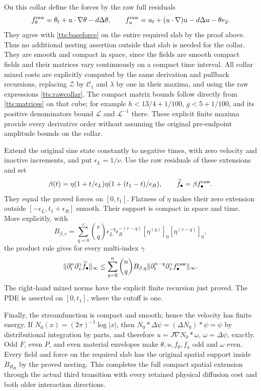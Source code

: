 On this collar define the forces by the raw full residuals
\begin{equation}\label{tts:rawcollar}
 f_\theta^{\rm raw}=\theta_t+u\cdot\nabla\theta-d\Delta\theta,
 \qquad
 f_u^{\rm raw}=u_t+(u\cdot\nabla)u-d\Delta u-\theta e_2.
\end{equation}
They agree with \eqref{tts:baseforce} on the entire required
slab by the proof above. Thus no additional nesting assertion
outside that slab is needed for the collar. They are smooth and
compact in space, since the fields are smooth compact fields and
their matrices vary continuously on a compact time interval.
All collar mixed costs are explicitly computed by the same
derivation and pullback recursions, replacing $\mathcal Z$ by
$\mathcal C_1$ and $\lambda$ by one in their maxima, and using
the raw expressions \eqref{tts:rawcollar}. The compact matrix
bounds follow directly from \eqref{tts:matrices} on that cube;
for example $h<13/4+1/100$, $g<5+1/100$, and its positive
denominators bound $\mathcal L$ and $\mathcal L^{-1}$ there.
These explicit finite maxima provide every derivative order without
assuming the original pre-endpoint amplitude bounds on the collar.

Extend the original sine state constantly to negative times, with
zero velocity and inactive increments, and put $\epsilon_L=1/\nu$.
Use the raw residuals of these extensions and set
\begin{equation}\label{tts:timecutoff}
 \beta(t)=\eta(1+t/\epsilon_L)
                   \eta(1+(t_1-t)/\epsilon_R),\qquad
 \widetilde f_\bullet=\beta f_\bullet^{\rm raw}.
\end{equation}
They equal the proved forces on $[0,t_1]$. Flatness of $\eta$
makes their zero extension outside
$[-\epsilon_L,t_1+\epsilon_R]$ smooth. Their support is compact
in space and time. More explicitly, with
\[
 B_{\beta,r}=\sum_{q=0}^r\binom rq
 \epsilon_L^{-q}\epsilon_R^{-(r-q)}
              [\eta^{(q)}]_0[\eta^{(r-q)}]_0,
\]
the product rule gives for every multi-index $\gamma$
\begin{equation}\label{tts:cutoffcost}
 \|\partial_t^n\partial_x^\gamma\widetilde f_\bullet\|_\infty
 \leq\sum_{q=0}^n\binom nq B_{\beta,q}
       \|\partial_t^{n-q}\partial_x^\gamma
                              f_\bullet^{\rm raw}\|_\infty.
\end{equation}
The right-hand mixed norms have the explicit finite recursion just
proved. The PDE is asserted on $[0,t_1]$, where the cutoff is one.

Finally, the streamfunction is compact and smooth; hence the velocity
has finite energy. If $N_0(x)=(2\pi)^{-1}\log|x|$, then
$N_0*\Delta\psi=(\Delta N_0)*\psi=\psi$ by distributional
integration by parts, and therefore
$u=J\nabla N_0*\omega$, $\omega=\Delta\psi$, exactly.
Odd $F$, even $P$, and even material envelopes make
$\theta,u,f_\theta,f_u$ odd and $\omega$ even. Every field and
force on the required slab has the original spatial support inside
$B_{R_H}$ by the proved nesting. This completes the full compact
spatial extension through the actual third transition with every
retained physical diffusion cost and both older interaction directions.
